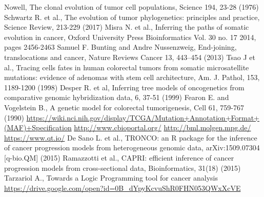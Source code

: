 \documentclass[a4paper]{article}
\begin{document}

	\begin{thebibliography}{20}

	   Nowell, The clonal evolution of tumor cell populations, Science 194, 23-28 (1976)
	   Schwartz R. et al., The evolution of tumor phylogenetics: principles and practice, Science Review, 213-229 (2017)
	   Misra N. et al., Inferring the paths of somatic evolution in cancer, Oxford University Press Bioinformatics Vol. 30 no. 17 2014, pages 2456-2463
           Samuel F. Bunting and Andre Nussenzweig, End-joining, translocations and cancer, Nature Reviews Cancer 13, 443–454 (2013)
		Tsao J et al., Tracing cells fates in human colorectal tumors from somatic microsatellite mutations: evidence of adenomas with stem cell architecture,
		Am. J. Pathol, 153, 1189-1200 (1998)
		Desper R. et al, Inferring tree models of oncogenetics from comparative genomic hybridization data, 6, 37-51 (1999)
		Fearon E. and Vogelstein B., A genetic model for colorectal tumorigenesis, Cell 61, 759-767 (1990)
		\href{https://wiki.nci.nih.gov/display/TCGA/Mutation+Annotation+Format+(MAF)+Specification}{https://wiki.nci.nih.gov/display/TCGA/Mutation+Annotation+Format+(MAF)+Specification}
		\href{http://www.cbioportal.org/}{http://www.cbioportal.org/}
		\href{http://bml.molgen.mpg.de/}{http://bml.molgen.mpg.de/}
		\href{https://www.qt.io/}{https://www.qt.io/}
		De Sano L. et al., TRONCO: an R package for the inference of cancer progression models from heterogeneous genomic data, arXiv:1509.07304  [q-bio.QM] (2015)
		Ramazzotti et al., CAPRI: efficient inference of cancer progression models from cross-sectional data, Bioinformatics, 31(18) (2015)
		Tarzariol A., Towards a Logic Programming tool for cancer analysis
		\href{https://drive.google.com/open?id=0B_dYpyKcvuShR0FHN053QWxXcVE}{https://drive.google.com/open?id=0B\_dYpyKcvuShR0FHN053QWxXcVE}
		
        \end{thebibliography}
\end{document}
